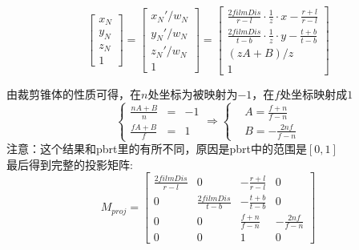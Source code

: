 \begin{displaymath}
\begin{bmatrix}
x_N\\
y_N\\
z_N\\
1
\end{bmatrix} = 
\begin{bmatrix}
x_N'/w_N\\
y_N'/w_N\\
z_N'/w_N\\
1
\end{bmatrix} = 
\begin{bmatrix}
\frac{2filmDis}{r - l}\cdot\frac{1}{z}\cdot x - \frac{r + l}{r - l}\\
\frac{2filmDis}{t - b}\cdot\frac{1}{z}\cdot y - \frac{t + b}{t - b}\\
(zA + B) / z \\
1
\end{bmatrix}
\end{displaymath}

由裁剪锥体的性质可得，在$n$处坐标为被映射为$-1$，在$f$处坐标映射成$1$
\begin{displaymath}
\left\{
\begin{aligned}{}
\frac{nA + B}{n} & = & -1\\
\frac{fA + B}{f} & = & 1
\end{aligned}
\right.
\Longrightarrow
\left\{
\begin{aligned}
&A = \frac{f + n}{f - n}\\
&B = -\frac{2nf}{f - n}
\end{aligned}
\right.
\end{displaymath}
注意：这个结果和pbrt里的有所不同，原因是pbrt中的范围是$[0,1]$
\\

最后得到完整的投影矩阵:
\begin{displaymath}
M_{proj} = 
\begin{bmatrix}
\frac{2filmDis}{r - l} & 0 & -\frac{r + l}{r - l} & 0\\
0 & \frac{2filmDis}{t - b} & -\frac{t + b}{t - b} & 0\\
0 & 0 & \frac{f + n}{f - n} & -\frac{2nf}{f - n}\\
0 & 0 & 1 & 0
\end{bmatrix}
\end{displaymath}
\\

